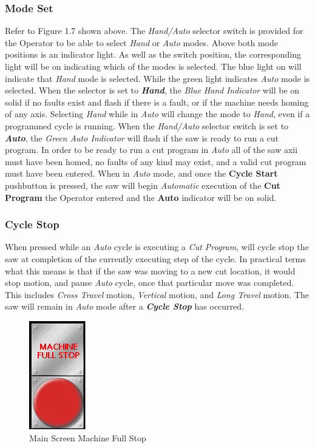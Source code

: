 \subsubsection{Mode Set} Refer to Figure 1.7 shown above. The \textit{Hand/Auto} selector switch is provided for the Operator to be able to select \textit{Hand} or \textit{Auto} modes. Above both mode positions is an indicator light. As well as the switch position, the corresponding light will be on indicating which of the modes is selected. The blue light on will indicate that \textit{Hand} mode is selected. While the green light indicates \textit{Auto} mode is selected. When the selector is set to \textbf{\textit{Hand}}, the \textit{Blue} \textit{Hand} \textit{Indicator} will be on solid if no faults exist and flash if there is a fault, or if the machine needs homing of any axis. Selecting \textit{Hand} while in \textit{Auto} will change the mode to \textit{Hand}, even if a programmed cycle is running. When the \textit{Hand/Auto} selector switch is set to \textbf{\textit{Auto}}, the \textit{Green Auto Indicator} will flash if the saw is ready to run a cut program. In order to be ready to run a cut program in \textit{Auto} all of the saw axii must have been homed, no faults of any kind may exist, and a valid cut program must have been entered. When in \textit{Auto} mode, and once the \textbf{Cycle Start} pushbutton is pressed, the saw will begin \textit{Automatic} execution of the \textbf{Cut Program} the Operator entered and the \textbf{Auto} indicator will be on solid.
\subsubsection{Cycle Stop} When pressed while an \textit{Auto} cycle is executing a \textit{Cut Program}, will cycle stop the saw at completion of the currently executing step of the cycle. In practical terms what this means is that if the saw was moving to a new cut location, it would stop motion, and pause \textit{Auto} cycle, once that particular move was completed. This includes \textit{Cross Travel} motion, \textit{Vertical} motion, and \textit{Long Travel} motion. The saw will remain in \textit{Auto} mode after a \textbf{\textit{Cycle Stop}} has occurred.
\begin{figure}
	\centering
	\includegraphics[width=.2\linewidth]{screen-captures/main-screen-mach-full-stop}
	\caption{Main Screen Machine Full Stop}
	\label{fig:main-mach-full-stop}
\end{figure}

